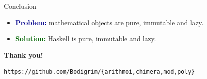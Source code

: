 \documentclass[handout]{beamer}
\def\problem{\textcolor{darkblue}{\bf Problem:} }
\begin{document}
\begin{frame}{Conclusion}

\begin{itemize}
\item
  \problem mathematical objects are pure, immutable and lazy. \pause
\item
  \textcolor{darkgreen}{\bf Solution:}
  Haskell is pure, immutable and lazy. \pause
\end{itemize}


\bigskip
\bigskip
\bigskip
\bigskip

\centerline{\Huge\bf Thank you!}

\bigskip

{\tt https://github.com/Bodigrim/\{arithmoi,chimera,mod,poly\}}

\end{frame}
\end{document}
